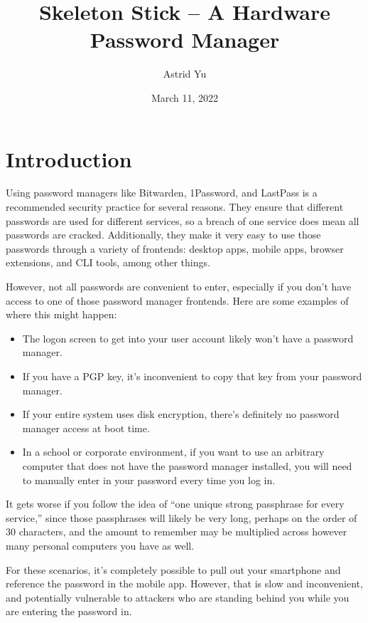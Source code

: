 \documentclass{article}
\title{Skeleton Stick -- A Hardware Password Manager}
\author{Astrid Yu}
\date{March 11, 2022}
\begin{document}
\maketitle
\tableofcontents

\section{Introduction}

Using password managers like Bitwarden, 1Password, and LastPass is a recommended security practice for several reasons. They ensure that different passwords are used for different services, so a breach of one service does mean all passwords are cracked. Additionally, they make it very easy to use those passwords through a variety of frontends: desktop apps, mobile apps, browser extensions, and CLI tools, among other things.

However, not all passwords are convenient to enter, especially if you don't have access to one of those password manager frontends. Here are some examples of where this might happen:

\begin{itemize}
    \item The logon screen to get into your user account likely won't have a password manager.
    \item If you have a PGP key, it's inconvenient to copy that key from your password manager.
    \item If your entire system uses disk encryption, there's definitely no password manager access at boot time.
    \item In a school or corporate environment, if you want to use an arbitrary computer that does not have the password manager installed, you will need to manually enter in your password every time you log in.
\end{itemize}

It gets worse if you follow the idea of ``one unique strong passphrase for every service,'' since those passphrases will likely be very long, perhaps on the order of 30 characters, and the amount to remember may be multiplied across however many personal computers you have as well.

For these scenarios, it's completely possible to pull out your smartphone and reference the password in the mobile app. However, that is slow and inconvenient, and potentially vulnerable to attackers who are standing behind you while you are entering the password in.
\end{document}
